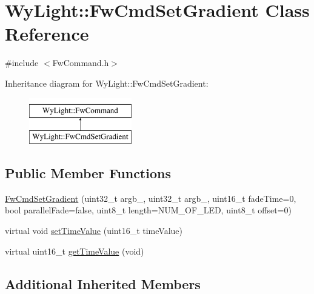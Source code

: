 \hypertarget{class_wy_light_1_1_fw_cmd_set_gradient}{\section{Wy\-Light\-:\-:Fw\-Cmd\-Set\-Gradient Class Reference}
\label{class_wy_light_1_1_fw_cmd_set_gradient}
}


{\ttfamily \#include $<$Fw\-Command.\-h$>$}

Inheritance diagram for Wy\-Light\-:\-:Fw\-Cmd\-Set\-Gradient\-:\begin{figure}[H]
\begin{center}
\leavevmode
\includegraphics[height=2.000000cm]{class_wy_light_1_1_fw_cmd_set_gradient}
\end{center}
\end{figure}
\subsection*{Public Member Functions}
\begin{DoxyCompactItemize}
\item 
\hyperlink{class_wy_light_1_1_fw_cmd_set_gradient_a1343bc698871f4824bae187943a7fd96}{Fw\-Cmd\-Set\-Gradient} (uint32\-\_\-t argb\-\_, uint32\-\_\-t argb\-\_, uint16\-\_\-t fade\-Time=0, bool parallel\-Fade=false, uint8\-\_\-t length=N\-U\-M\-\_\-\-O\-F\-\_\-\-L\-E\-D, uint8\-\_\-t offset=0)
\item 
virtual void \hyperlink{class_wy_light_1_1_fw_cmd_set_gradient_a166343302d063f63dbf8d6eecca8698e}{set\-Time\-Value} (uint16\-\_\-t time\-Value)
\item 
virtual uint16\-\_\-t \hyperlink{class_wy_light_1_1_fw_cmd_set_gradient_af735c51205661fdd43fcd14c6f63a5f6}{get\-Time\-Value} (void)
\end{DoxyCompactItemize}
\subsection*{Additional Inherited Members}



